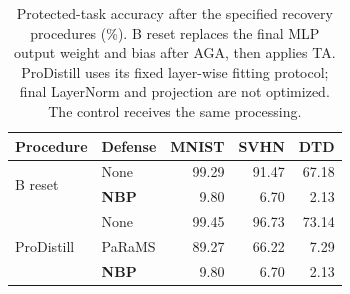\begin{table}[!t]
\centering
\small
\setlength{\tabcolsep}{4pt}
\caption{Protected-task accuracy after the specified recovery procedures (\%). B reset replaces the final MLP output weight and bias after AGA, then applies TA. ProDistill uses its fixed layer-wise fitting protocol; final LayerNorm and projection are not optimized. The control receives the same processing.}
\label{tab:recovery}
\begin{tabular}{llrrr}
\toprule
Procedure & Defense & MNIST & SVHN & DTD \\
\midrule
\multirow{2}{*}{B reset} & None & 99.29 & 91.47 & 67.18 \\
 & \textbf{NBP} & 9.80 & 6.70 & 2.13 \\
\midrule
\multirow{3}{*}{ProDistill} & None & 99.45 & 96.73 & 73.14 \\
 & PaRaMS & 89.27 & 66.22 & 7.29 \\
 & \textbf{NBP} & 9.80 & 6.70 & 2.13 \\
\bottomrule
\end{tabular}
\end{table}
